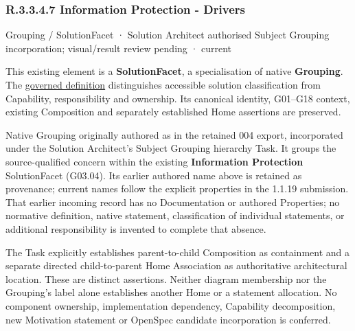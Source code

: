 \subsubsection*{R.3.3.4.7 Information Protection - Drivers}
\label{navigation:R.3.3.4.7}

\label{element:ce45a338a1fc4d11a8d64ce898119f94}
{\small Grouping / SolutionFacet · Solution Architect authorised Subject Grouping incorporation; visual/result review pending · current}\par

This existing element is a \textbf{SolutionFacet}, a specialisation of native
\textbf{Grouping}. The \href{\detokenize{../../../../../../../governance/continuum-representation.md#solutionfacet-classification--1119-candidate}}{governed definition}
distinguishes accessible solution classification from Capability, responsibility
and ownership. Its canonical identity, G01–G18 context, existing Composition
and separately established Home assertions are preserved.



Native Grouping originally authored as \texttt{} in the retained 004 export,
incorporated under the Solution Architect's Subject Grouping hierarchy Task.
It groups the source-qualified \texttt{} concern within
the existing \textbf{Information Protection} SolutionFacet (G03.04). Its earlier authored name above is retained as provenance; current names
follow the explicit properties in the 1.1.19 submission.
That earlier incoming record has no Documentation or authored Properties; no normative
definition, native statement, classification of individual statements, or
additional responsibility is invented to complete that absence.



The Task explicitly establishes parent-to-child Composition as containment and
a separate directed child-to-parent Home Association as authoritative architectural
location. These are distinct assertions. Neither diagram membership nor the
Grouping's label alone establishes another Home or a statement allocation.
No component ownership, implementation dependency, Capability decomposition,
new Motivation statement or OpenSpec candidate incorporation is conferred.



